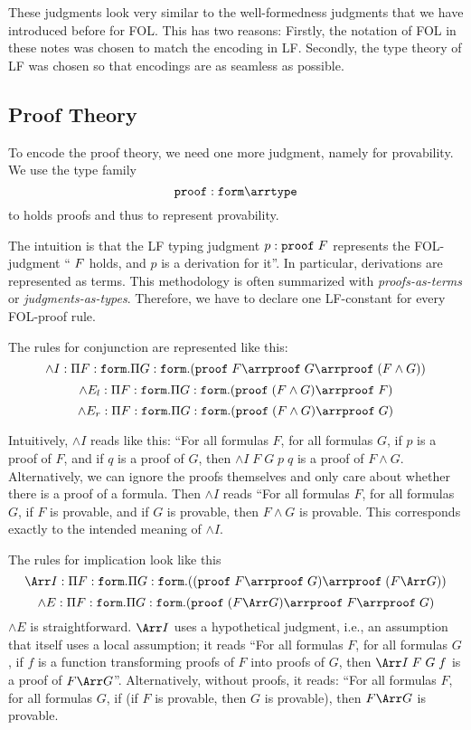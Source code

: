 These judgments look very similar to the well-formedness judgments that we have introduced before for FOL. This has two reasons: Firstly, the notation of FOL in these notes was chosen to match the encoding in LF. Secondly, the type theory of LF was chosen so that encodings are as seamless as possible.

\subsection{Proof Theory}

To encode the proof theory, we need one more judgment, namely for provability. We use the type family
\[\PROOF:\FORM\arr\TYPE\]
to holds proofs and thus to represent provability.

The intuition is that the LF typing judgment $p:\mathtt{proof}\;F$ represents the FOL-judgment ``$\;F$ holds, and $p$ is a derivation for it''. In particular, derivations are represented as terms. This methodology is often summarized with \emph{proofs-as-terms} or \emph{judgments-as-types}.
Therefore, we have to declare one LF-constant for every FOL-proof rule.

The rules for conjunction are represented like this:
\[\wedge I:\P{F}{\FORM}\P{G}{\FORM}(\PROOF\;F\arr\PROOF\;G\arr \PROOF\;(F\wedge G))\]
\[\wedge E_l:\P{F}{\FORM}\P{G}{\FORM}(\PROOF\;(F\wedge G)\arr\PROOF\;F)\]
\[\wedge E_r:\P{F}{\FORM}\P{G}{\FORM}(\PROOF\;(F\wedge G)\arr\PROOF\;G)\]

Intuitively, $\wedge I$ reads like this: ``For all formulas $F$, for all formulas $G$, if $p$ is a proof of $F$, and if $q$ is a proof of $G$, then $\wedge I\;F\;G\;p\;q$ is a proof of $F\wedge G$. Alternatively, we can ignore the proofs themselves and only care about whether there is a proof of a formula. Then $\wedge I$ reads ``For all formulas $F$, for all formulas $G$, if $F$ is provable, and if $G$ is provable, then $F\wedge G$ is provable. This corresponds exactly to the intended meaning of $\wedge I$.

The rules for implication look like this
\[\impl I:\P{F}{\FORM}\P{G}{\FORM}((\PROOF\;F\arr\PROOF\;G)\arr \PROOF\;(F\impl G))\]
\[\wedge E:\P{F}{\FORM}\P{G}{\FORM}(\PROOF\;(F\impl G)\arr\PROOF\;F\arr\PROOF\;G)\]
$\wedge E$ is straightforward. $\impl I$ uses a hypothetical judgment, i.e., an assumption that itself uses a local assumption; it reads ``For all formulas $F$, for all formulas $G$, if $f$ is a function transforming proofs of $F$ into proofs of $G$, then $\impl I\;F\;G\;f$ is a proof of $F\impl G$''. Alternatively, without proofs, it reads: ``For all formulas $F$, for all formulas $G$, if (if $F$ is provable, then $G$ is provable), then $F\impl G$ is provable.

